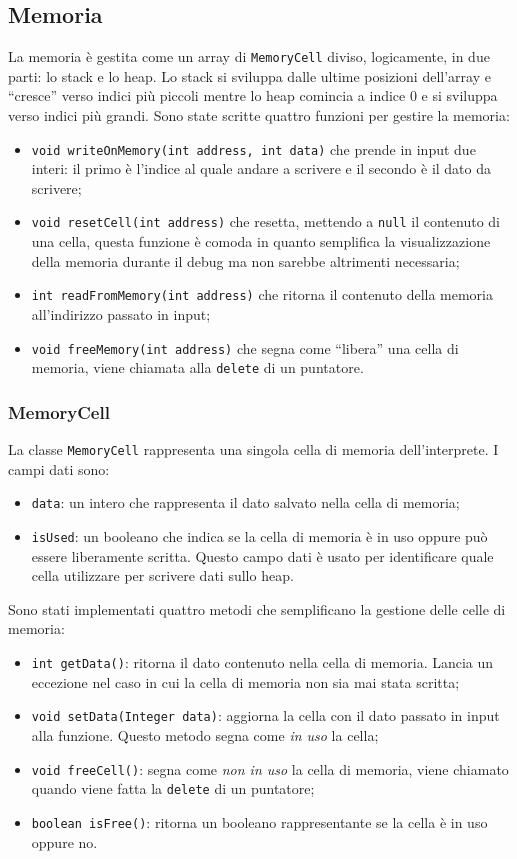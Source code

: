 \documentclass[../report.tex]{subfiles}
\begin{document}
\subsection{Memoria}
La memoria \`e gestita come un array di \verb|MemoryCell| diviso, logicamente, in due parti: lo stack e lo heap. Lo stack si sviluppa dalle ultime posizioni dell'array e ``cresce'' verso indici pi\`u piccoli mentre lo heap comincia a indice 0 e si sviluppa verso indici pi\`u grandi. Sono state scritte quattro funzioni per gestire la memoria:
\begin{itemize}
    \item \verb|void writeOnMemory(int address, int data)| che prende in input due interi: il primo \`e l'indice al quale andare a scrivere e il secondo \`e il dato da scrivere;
    \item \verb|void resetCell(int address)| che resetta, mettendo a \verb|null| il contenuto di una cella, questa funzione \`e comoda in quanto semplifica la visualizzazione della memoria durante il debug ma non sarebbe altrimenti necessaria;
    \item \verb|int readFromMemory(int address)| che ritorna il contenuto della memoria all'indirizzo passato in input;
    \item \verb|void freeMemory(int address)| che segna come ``libera'' una cella di memoria, viene chiamata alla \verb|delete| di un puntatore.
\end{itemize}

\subsubsection{MemoryCell}
La classe \verb|MemoryCell| rappresenta una singola cella di memoria dell'interprete. I campi dati sono: 
\begin{itemize}
    \item \verb|data|: un intero che rappresenta il dato salvato nella cella di memoria;
    \item \verb|isUsed|: un booleano che indica se la cella di memoria \`e in uso oppure pu\`o essere liberamente scritta. Questo campo dati \`e usato per identificare quale cella utilizzare per scrivere dati sullo heap.
\end{itemize}
Sono stati implementati quattro metodi che semplificano la gestione delle celle di memoria:
\begin{itemize}
    \item \verb|int getData()|: ritorna il dato contenuto nella cella di memoria. Lancia un eccezione nel caso in cui la cella di memoria non sia mai stata scritta;
    \item \verb|void setData(Integer data)|: aggiorna la cella con il dato passato in input alla funzione. Questo metodo segna come \textit{in uso} la cella; 
    \item \verb|void freeCell()|: segna come \textit{non in uso} la cella di memoria, viene chiamato quando viene fatta la \verb|delete| di un puntatore;
    \item \verb|boolean isFree()|: ritorna un booleano rappresentante se la cella \`e in uso oppure no.
\end{itemize}
\end{document}
